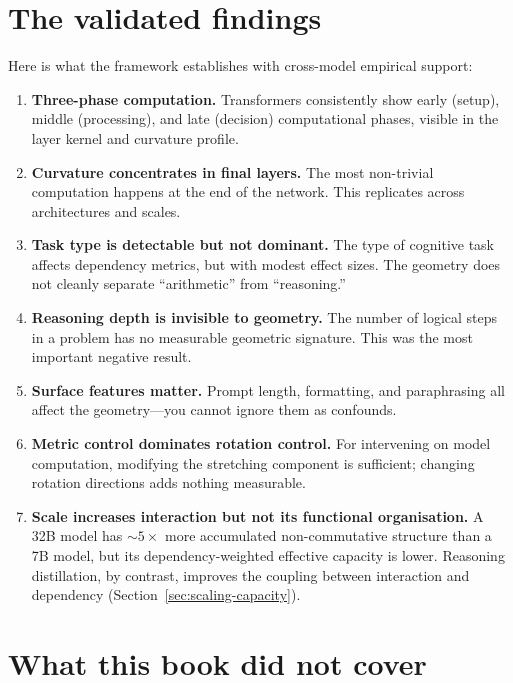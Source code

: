 \documentclass[11pt, twoside, openright]{memoir}
\begin{document}
\section{The validated findings}

Here is what the framework establishes with cross-model empirical support:

\begin{enumerate}
\item \textbf{Three-phase computation.} Transformers consistently show
  early (setup), middle (processing), and late (decision) computational
  phases, visible in the layer kernel and curvature profile.

\item \textbf{Curvature concentrates in final layers.} The most
  non-trivial computation happens at the end of the network. This
  replicates across architectures and scales.

\item \textbf{Task type is detectable but not dominant.} The type of
  cognitive task affects dependency metrics, but with modest effect
  sizes. The geometry does not cleanly separate ``arithmetic'' from
  ``reasoning.''

\item \textbf{Reasoning depth is invisible to geometry.} The number
  of logical steps in a problem has no measurable geometric signature.
  This was the most important negative result.

\item \textbf{Surface features matter.} Prompt length, formatting,
  and paraphrasing all affect the geometry---you cannot ignore them
  as confounds.

\item \textbf{Metric control dominates rotation control.} For
  intervening on model computation, modifying the stretching component
  is sufficient; changing rotation directions adds nothing measurable.

\item \textbf{Scale increases interaction but not its functional
  organisation.} A 32B model has ${\sim}5\times$ more accumulated
  non-commutative structure than a 7B model, but its
  dependency-weighted effective capacity is lower. Reasoning
  distillation, by contrast, improves the coupling between interaction
  and dependency (Section~\ref{sec:scaling-capacity}).
\end{enumerate}

\section{What this book did not cover}
\end{document}
